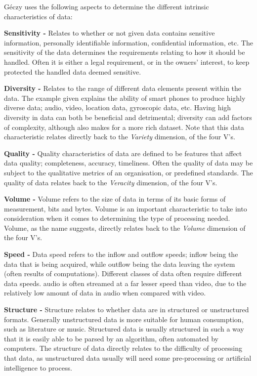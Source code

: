 \documentclass[a4paper,11pt]{article}
\begin{document}
\noindent G\'eczy uses the following aspects to determine the different intrinsic characteristics of data:

\noindent \textbf{Sensitivity -} Relates to whether or not given data contains sensitive information, \ie{}personally
identifiable information, confidential information, etc. The sensitivity of the data determines the requirements relating
to how it should be handled. Often it is either a legal requirement, or in the owners' interest, to keep protected the
handled data deemed sensitive.

\noindent \textbf{Diversity -} Relates to the range of different data elements present within the data. The example given
explains the ability of smart phones to produce highly diverse data; \eg{}audio, video, location data, gyroscopic data,
etc. Having high diversity in data can both be beneficial and detrimental; diversity can add factors of complexity,
although also makes for a more rich dataset. Note that this data characteristic relates directly back to the
\emph{Variety} dimension, of the four V's.

\noindent \textbf{Quality -} Quality characteristics of data are defined to be features that affect data quality;
\eg{}completeness, accuracy, timeliness. Often the quality of data may be subject to the qualitative metrics of an
organisation, or predefined standards. The quality of data relates back to the \emph{Veracity} dimension, of the four
V's.

\noindent \textbf{Volume -} Volume refers to the size of data in terms of its basic forms of measurement, bits and bytes.
Volume is an important characteristic to take into consideration when it comes to determining the type of processing
needed. Volume, as the name suggests, directly relates back to the \emph{Volume} dimension of the four V's.

\noindent \textbf{Speed -} Data speed refers to the inflow and outflow speeds; inflow being the data that is being
acquired, while outflow being the data leaving the system (often results of computations). Different classes of data
often require different data speeds. \eg{}audio is often streamed at a far lesser speed than video, due to the
relatively low amount of data in audio when compared with video.

\noindent \textbf{Structure -} Structure relates to whether data are in structured or unstructured formats. Generally
unstructured data is more suitable for human consumption, such as literature or music. Structured data is usually
structured in such a way that it is easily able to be parsed by an algorithm, often automated by computers. The
structure of data directly relates to the difficulty of processing that data, as unstructured data usually will need
some pre-processing or artificial intelligence to process.
\end{document}
